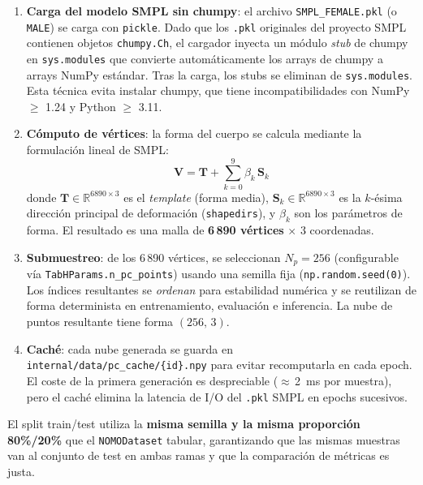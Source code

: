 \documentclass[a4paper,11pt]{article}
\begin{document}
\begin{enumerate}
    \item \textbf{Carga del modelo SMPL sin chumpy}: el archivo
          \texttt{SMPL\_FEMALE.pkl} (o \texttt{MALE}) se carga con
          \texttt{pickle}. Dado que los \texttt{.pkl} originales del proyecto
          SMPL contienen objetos \texttt{chumpy.Ch}, el cargador inyecta un
          módulo \emph{stub} de chumpy en \texttt{sys.modules} que convierte
          automáticamente los arrays de chumpy a arrays NumPy estándar. Tras
          la carga, los stubs se eliminan de \texttt{sys.modules}. Esta
          técnica evita instalar chumpy, que tiene incompatibilidades con
          NumPy $\geq$ 1.24 y Python $\geq$ 3.11.

    \item \textbf{Cómputo de vértices}: la forma del cuerpo se calcula
          mediante la formulación lineal de SMPL:
          \begin{equation}
              \label{eq:smpl_shape}
              \bm{V} = \bm{T} + \sum_{k=0}^{9}\beta_k\,\bm{S}_k
          \end{equation}
          donde $\bm{T}\in\mathbb{R}^{6890\times3}$ es el \emph{template}
          (forma media), $\bm{S}_k\in\mathbb{R}^{6890\times3}$ es la $k$-ésima
          dirección principal de deformación (\texttt{shapedirs}), y $\beta_k$
          son los parámetros de forma. El resultado es una malla de
          \textbf{6\,890 vértices} $\times$ 3 coordenadas.

    \item \textbf{Submuestreo}: de los 6\,890 vértices, se seleccionan
          $N_p = 256$ (configurable vía \texttt{TabHParams.n\_pc\_points})
          usando una semilla fija (\texttt{np.random.seed(0)}). Los índices
          resultantes se \emph{ordenan} para estabilidad numérica y se
          reutilizan de forma determinista en entrenamiento, evaluación e
          inferencia. La nube de puntos resultante tiene forma
          $(256,\,3)$.

    \item \textbf{Caché}: cada nube generada se guarda en
          \texttt{internal/data/pc\_cache/\{id\}.npy} para evitar recomputarla
          en cada epoch. El coste de la primera generación es despreciable
          ($\approx$\,2~ms por muestra), pero el caché elimina la latencia
          de I/O del \texttt{.pkl} SMPL en epochs sucesivos.
\end{enumerate}

El split train/test utiliza la \textbf{misma semilla y la misma proporción
80\%/20\%} que el \texttt{NOMODataset} tabular, garantizando que las mismas
muestras van al conjunto de test en ambas ramas y que la comparación de
métricas es justa.
\end{document}
